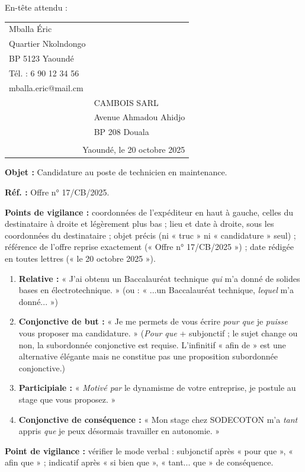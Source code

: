 \documentclass[11pt]{article}
\begin{document}
\begin{corrige}
En-tête attendu :

\begin{center}
\begin{tabularx}{\linewidth}{X X}
Mballa Éric & \\
Quartier Nkolndongo & \\
BP 5123 Yaoundé & \\
Tél. : 6 90 12 34 56 & \\
mballa.eric@mail.cm & \\
& CAMBOIS SARL\\
& Avenue Ahmadou Ahidjo\\
& BP 208 Douala\\
& \\
\multicolumn{2}{r}{Yaoundé, le 20 octobre 2025}\\
\end{tabularx}
\end{center}

\textbf{Objet :} Candidature au poste de technicien en maintenance.

\textbf{Réf. :} Offre n° 17/CB/2025.

\textbf{Points de vigilance :} coordonnées de l'expéditeur en haut à gauche, celles du destinataire à droite et légèrement plus bas ; lieu et date à droite, sous les coordonnées du destinataire ; objet précis (ni « truc » ni « candidature » seul) ; référence de l'offre reprise exactement (« Offre n° 17/CB/2025 ») ; date rédigée en toutes lettres (« le 20 octobre 2025 »).
\end{corrige}

\begin{corrige}
\begin{enumerate}
\item \textbf{Relative :} « J'ai obtenu un Baccalauréat technique \emph{qui} m'a donné de solides bases en électrotechnique. » (ou : « ...un Baccalauréat technique, \emph{lequel} m'a donné... »)
\item \textbf{Conjonctive de but :} « Je me permets de vous écrire \emph{pour que} je \emph{puisse} vous proposer ma candidature. » (\emph{Pour que} + subjonctif ; le sujet change ou non, la subordonnée conjonctive est requise. L'infinitif « afin de » est une alternative élégante mais ne constitue pas une proposition subordonnée conjonctive.)
\item \textbf{Participiale :} « \emph{Motivé par} le dynamisme de votre entreprise, je postule au stage que vous proposez. »
\item \textbf{Conjonctive de conséquence :} « Mon stage chez SODECOTON m'a \emph{tant} appris \emph{que} je peux désormais travailler en autonomie. »
\end{enumerate}
\textbf{Point de vigilance :} vérifier le mode verbal : subjonctif après « pour que », « afin que » ; indicatif après « si bien que », « tant... que » de conséquence.
\end{corrige}
\end{document}
